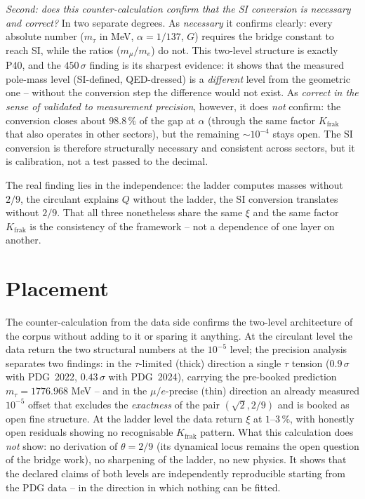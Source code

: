 \emph{Second: does this counter-calculation confirm that the SI conversion
is necessary and correct?} In two separate degrees. As \emph{necessary} it
confirms clearly: every absolute number ($m_\tau$ in MeV, $\alpha=1/137$,
$G$) requires the bridge constant to reach SI, while the ratios
($m_\mu/m_e$) do not. This two-level structure is exactly P40, and the
$450\,\sigma$ finding is its sharpest evidence: it shows that the measured
pole-mass level (SI-defined, QED-dressed) is a \emph{different} level from
the geometric one -- without the conversion step the difference would not
exist. As \emph{correct in the sense of validated to measurement
precision}, however, it does \emph{not} confirm: the conversion closes
about $98.8\,\%$ of the gap at $\alpha$ (through the same factor
$K_{\text{frak}}$ that also operates in other sectors), but the remaining
$\sim10^{-4}$ stays open. The SI conversion is therefore structurally
necessary and consistent across sectors, but it is calibration, not a test
passed to the decimal.

The real finding lies in the independence: the ladder computes masses
without $2/9$, the circulant explains $Q$ without the ladder, the SI
conversion translates without $2/9$. That all three nonetheless share the
same $\xi$ and the same factor $K_{\text{frak}}$ is the consistency of the
framework -- not a dependence of one layer on another.

\section{Placement}
The counter-calculation from the data side confirms the two-level
architecture of the corpus without adding to it or sparing it anything. At
the circulant level the data return the two structural numbers at the
$10^{-5}$ level; the precision analysis separates two findings: in the
$\tau$-limited (thick) direction a single $\tau$ tension ($0.9\,\sigma$ with PDG~2022, $0.43\,\sigma$ with
PDG~2024), carrying
the pre-booked prediction $m_\tau = 1776.968$ MeV -- and in the
$\mu/e$-precise (thin) direction an already measured $10^{-5}$ offset that
excludes the \emph{exactness} of the pair $(\sqrt2, 2/9)$ and is booked as
open fine structure. At the ladder level
the data return $\xi$ at $1$--$3\,\%$, with honestly open residuals showing
no recognisable $K_{\text{frak}}$ pattern. What this calculation does
\emph{not} show: no derivation of $\theta=2/9$ (its dynamical locus remains
the open question of the bridge work), no sharpening of the ladder, no new
physics. It shows that the declared claims of both levels are independently
reproducible starting from the PDG data -- in the direction in which nothing
can be fitted.

